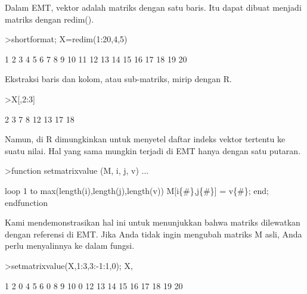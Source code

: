 \documentclass[a4paper,10pt]{article}
\begin{document}
\begin{eulernotebook}
\begin{eulercomment}
\begin{eulercomment}
\begin{eulercomment}
Dalam EMT, vektor adalah matriks dengan satu baris. Itu dapat dibuat
menjadi matriks dengan redim().
\end{eulercomment}
\begin{eulerprompt}
>shortformat; X=redim(1:20,4,5)
\end{eulerprompt}
\begin{euleroutput}
          1         2         3         4         5 
          6         7         8         9        10 
         11        12        13        14        15 
         16        17        18        19        20 
\end{euleroutput}
\begin{eulercomment}
Ekstraksi baris dan kolom, atau sub-matriks, mirip dengan R.
\end{eulercomment}
\begin{eulerprompt}
>X[,2:3]
\end{eulerprompt}
\begin{euleroutput}
          2         3 
          7         8 
         12        13 
         17        18 
\end{euleroutput}
\begin{eulercomment}
Namun, di R dimungkinkan untuk menyetel daftar indeks vektor tertentu
ke suatu nilai. Hal yang sama mungkin terjadi di EMT hanya dengan satu
putaran.
\end{eulercomment}
\begin{eulerprompt}
>function setmatrixvalue (M, i, j, v) ...
\end{eulerprompt}
\begin{eulerudf}
  loop 1 to max(length(i),length(j),length(v))
     M[i\{#\},j\{#\}] = v\{#\};
  end;
  endfunction
\end{eulerudf}
\begin{eulercomment}
Kami mendemonstrasikan hal ini untuk menunjukkan bahwa matriks
dilewatkan dengan referensi di EMT. Jika Anda tidak ingin mengubah
matriks M asli, Anda perlu menyalinnya ke dalam fungsi.
\end{eulercomment}
\begin{eulerprompt}
>setmatrixvalue(X,1:3,3:-1:1,0); X,
\end{eulerprompt}
\begin{euleroutput}
          1         2         0         4         5 
          6         0         8         9        10 
          0        12        13        14        15 
         16        17        18        19        20 
\end{euleroutput}
\begin{eulercomment}

\end{eulercomment}
\end{eulercomment}
\end{eulercomment}
\end{eulernotebook}
\end{document}
